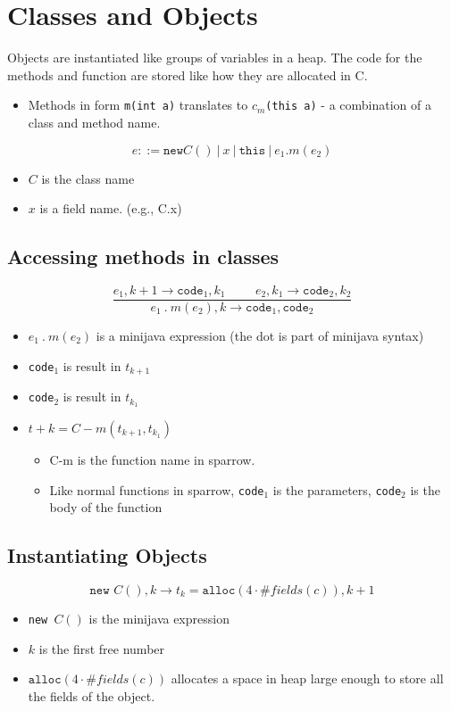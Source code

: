 \documentclass[10pt]{article}
\begin{document}
\section*{Classes and Objects}
Objects are instantiated like groups of variables in a heap.  The code for the methods and function are stored like how they are allocated in C.\
\begin{itemize}
    \item Methods in form \texttt{m(int a)} translates to \texttt{$c_m$(this a)} - a combination of a class and method name.
\end{itemize}
\[e ::= \texttt{new} C() \:\vert\: x \:\vert\: \texttt{this} \:\vert\: e_1 . m(e_2)\]
\begin{itemize}
    \item $C$ is the class name
    \item $x$ is a field name.  (e.g., C.x)
\end{itemize}
\subsection*{Accessing methods in classes}
\[\frac{e_1, k + 1 \rightarrow \texttt{code}_1, k_1 \hspace{1cm} e_2, k_1 \rightarrow \texttt{code}_2, k_2}{e_1 \:.\: m(e_2), k \rightarrow \texttt{code}_1, \texttt{code}_2}\]
\begin{itemize}
    \item $e_1 \:.\: m(e_2)$ is a minijava expression (the dot is part of minijava syntax)
    \item \texttt{code}$_1$ is result in $t_{k + 1}$
    \item \texttt{code}$_2$ is result in $t_{k_1}$
    \item $t+k = C-m (t_{k + 1}, t_{k_1})$
    \begin{itemize}
        \item C-m is the function name in sparrow.
        \item Like normal functions in sparrow, \texttt{code}$_1$ is the parameters, \texttt{code}$_2$ is the body of the function
    \end{itemize}
\end{itemize}

\subsection*{Instantiating Objects}
\[\texttt{new } C(), k \rightarrow t_k = \texttt{alloc}(4 \cdot \#fields(c)), k + 1\]
\begin{itemize}
    \item \texttt{new }$C()$ is the minijava expression
    \item $k$ is the first free number
    \item $\texttt{alloc}(4 \cdot \#fields(c))$ allocates a space in heap large enough to store all the fields of the object.
\end{itemize}
\end{document}
